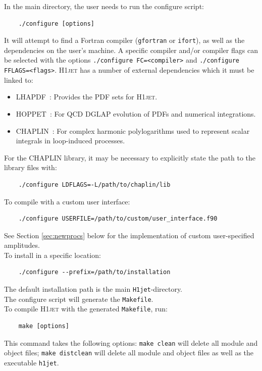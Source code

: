 \documentclass[12pt]{article}
\begin{document}
\noindent
In the main directory, the user needs to run the configure script: 
\begin{lstlisting}
	./configure [options] 
\end{lstlisting}
It will attempt to find a Fortran compiler (\texttt{gfortran} or
\texttt{ifort}), as well as the dependencies on the user's machine. A
specific compiler and/or compiler flags can be selected with the
options \texttt{./configure FC=<compiler>} and \texttt{./configure
  FFLAGS=<flags>}. \textsc{H1jet} has a number of external
dependencies which it must be linked to:
\begin{itemize}
	\item \textsc{LHAPDF}~\cite{Buckley:2014ana}: Provides the PDF sets for \textsc{H1jet}. 
	\item \textsc{HOPPET}~\cite{Salam:2008qg}: For QCD DGLAP
          evolution of PDFs and numerical integrations.
	\item \textsc{CHAPLIN}~\cite{Buehler:2011ev}: For complex
          harmonic polylogarithms used to represent scalar integrals
          in loop-induced processes.
\end{itemize} 
For the \textsc{CHAPLIN} library, it may be necessary to explicitly state the path to the library files with:
\begin{lstlisting}
	./configure LDFLAGS=-L/path/to/chaplin/lib 
\end{lstlisting}
To compile with a custom user interface: 
\begin{lstlisting}
	./configure USERFILE=/path/to/custom/user_interface.f90  
\end{lstlisting}
See Section \ref{sec:newprocs} below for the implementation of custom user-specified amplitudes. \\ 
To install in a specific location: 
\begin{lstlisting}
	./configure --prefix=/path/to/installation 
\end{lstlisting}
The default installation path is the main \texttt{H1jet}-directory. \\ 
The configure script will generate the \texttt{Makefile}. \\ 
To compile \textsc{H1jet} with the generated \texttt{Makefile}, run: 
\begin{lstlisting}
	make [options] 
\end{lstlisting}
This command takes the following options: \texttt{make clean} will delete all module and object files; \texttt{make distclean} will delete all module and object files as well as the executable \texttt{h1jet}. \\ 
\end{document}
